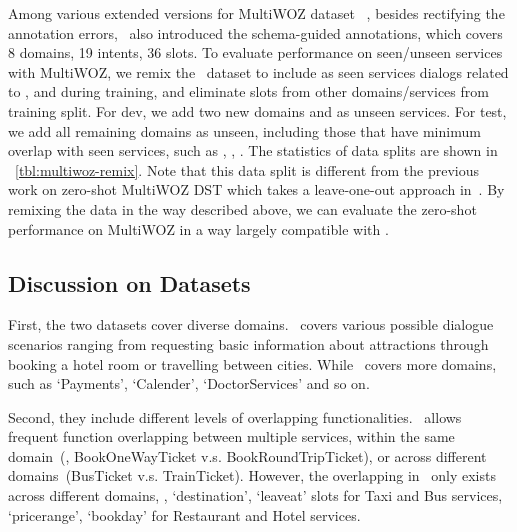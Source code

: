 Among various extended versions for MultiWOZ
dataset~\cite[2.0-2.3,][]{budzianowski2018multiwoz,
  eric2020multiwoz,zang-etal-2020-multiwoz,han2020multiwoz} , besides
rectifying the annotation errors, \multiwoz ~also introduced the
schema-guided annotations, which covers 8 domains, 19 intents, 36
slots.  To evaluate performance on seen/unseen services with MultiWOZ,
we remix the \multiwoz~dataset to include as seen services dialogs
related to ,  and 
during training, and eliminate slots from other domains/services from
training split.  For dev, we add two new domains  and  as unseen services. For test, we add all remaining domains as
unseen, including those that have minimum overlap with seen services,
such as , , . The statistics of
data splits are shown in
~\autoref{tbl:multiwoz-remix}. Note that this data split
is different from the previous work on zero-shot MultiWOZ DST which
takes a leave-one-out approach in~\citet{wu2019transferable}. By
remixing the data in the way described above, we can evaluate the
zero-shot performance on MultiWOZ in a way largely compatible with
\sgdst.

\subsection{Discussion on Datasets}
\label{ssec:sgd:discussion-datasets}

First, the two datasets cover diverse domains. \multiwoz~covers
various possible dialogue scenarios ranging from requesting basic
information about attractions through booking a hotel room or
travelling between cities. While \sgdst~covers more domains, such as
`Payments', `Calender', `DoctorServices' and so on.

Second, they include different levels of overlapping
functionalities. \sgdst~allows frequent function overlapping between
multiple services, within the same domain~(\eg, BookOneWayTicket
v.s. BookRoundTripTicket), or across different domains~(BusTicket
v.s. TrainTicket). However, the overlapping in \multiwoz~only exists
across different domains, \eg, `destination', `leaveat' slots for
Taxi and Bus services, `pricerange', `bookday' for Restaurant and
Hotel services.

